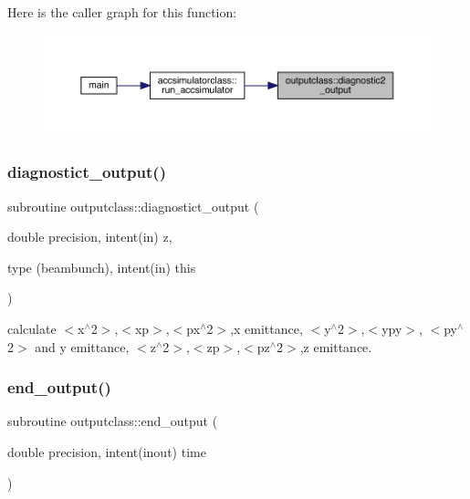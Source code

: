 Here is the caller graph for this function\+:\nopagebreak
\begin{figure}[H]
\begin{center}
\leavevmode
\includegraphics[width=350pt]{namespaceoutputclass_a678b3c4ce8356d742c32eb555ee16f08_icgraph}
\end{center}
\end{figure}
\mbox{\label{namespaceoutputclass_a4df9d27795de9f5c2d2a8827e2cb7adf}} 
\subsubsection{\texorpdfstring{diagnostict\_output()}{diagnostict\_output()}}
{\footnotesize\ttfamily subroutine outputclass\+::diagnostict\+\_\+output (\begin{DoxyParamCaption}\item[{double precision, intent(in)}]{z,  }\item[{type (beambunch), intent(in)}]{this }\end{DoxyParamCaption})}



calculate $<$x$^\wedge$2$>$,$<$xp$>$,$<$px$^\wedge$2$>$,x emittance, $<$y$^\wedge$2$>$,$<$ypy$>$, $<$py$^\wedge$2$>$ and y emittance, $<$z$^\wedge$2$>$,$<$zp$>$,$<$pz$^\wedge$2$>$,z emittance. 

\mbox{\label{namespaceoutputclass_af40e04d104fbdb28b9cae7fb5fcba121}} 
\subsubsection{\texorpdfstring{end\_output()}{end\_output()}}
{\footnotesize\ttfamily subroutine outputclass\+::end\+\_\+output (\begin{DoxyParamCaption}\item[{double precision, intent(inout)}]{time }\end{DoxyParamCaption})}



